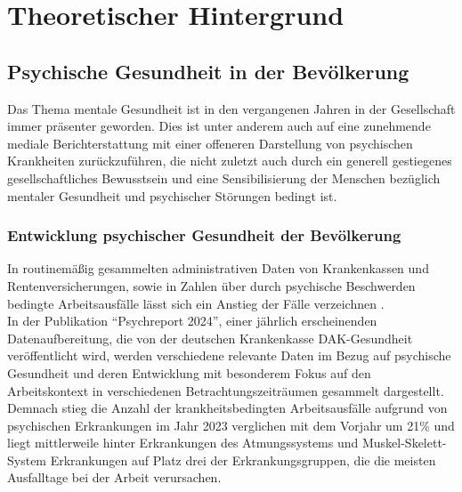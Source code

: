 \chapter{Theoretischer Hintergrund}\label{sec:theoretischer_hintergrund}


\section{Psychische Gesundheit in der Bevölkerung}\label{subsec:psychische_gesundheit}

Das Thema mentale Gesundheit ist in den vergangenen Jahren in der Gesellschaft immer präsenter geworden. Dies ist unter anderem auch auf eine zunehmende mediale Berichterstattung mit einer offeneren Darstellung von psychischen Krankheiten zurückzuführen, die nicht zuletzt auch durch ein generell gestiegenes gesellschaftliches Bewusstsein und eine Sensibilisierung der Menschen bezüglich mentaler Gesundheit und psychischer Störungen bedingt ist.

\subsection{Entwicklung psychischer Gesundheit der Bevölkerung}\label{subsubsec:entwicklung_psychische_gesundheit}

In routinemäßig gesammelten administrativen Daten von Krankenkassen und Rentenversicherungen, 
sowie in Zahlen über durch psychische Beschwerden bedingte Arbeitsausfälle 
lässt sich ein Anstieg der Fälle verzeichnen 
\cite[]{latex:arzteblatt,latex:dak}. \\ %
In der Publikation “Psychreport 2024”, einer jährlich erscheinenden Datenaufbereitung, 
die von der deutschen Krankenkasse DAK-Gesundheit veröffentlicht wird, 
werden verschiedene relevante Daten im Bezug auf psychische Gesundheit 
und deren Entwicklung mit besonderem Fokus auf den Arbeitskontext 
in verschiedenen Betrachtungszeiträumen gesammelt dargestellt. \\

Demnach stieg die Anzahl der krankheitsbedingten Arbeitsausfälle 
aufgrund von psychischen Erkrankungen im Jahr 2023 verglichen mit dem Vorjahr um 21\% 
und liegt mittlerweile hinter Erkrankungen des Atmungssystems 
und Muskel-Skelett-System Erkrankungen auf Platz drei der Erkrankungsgruppen, 
die die meisten Ausfalltage bei der Arbeit verursachen. 

